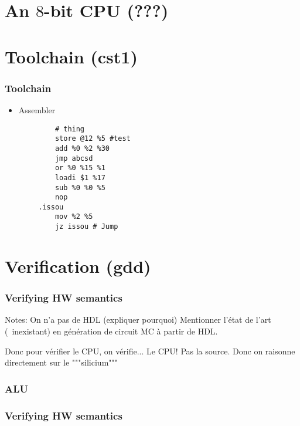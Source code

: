 \documentclass[aspectratio=169]{beamer}
\begin{document}
\section{An $8$-bit CPU (???)}
\begin{frame}
\end{frame}

\section{Toolchain (cst1)}
\begin{frame}[fragile]
	\frametitle{Toolchain}
	\begin{itemize}
		\item Assembler
	\end{itemize}
	\begin{verbatim}
            # thing
            store @12 %5 #test
            add %0 %2 %30
            jmp abcsd
            or %0 %15 %1
            loadi $1 %17
            sub %0 %0 %5
            nop
        .issou
            mov %2 %5
            jz issou # Jump
        \end{verbatim}
\end{frame}

\section{Verification (gdd)}
\begin{frame}
	\frametitle{Verifying HW semantics}
	Notes: On n'a pas de HDL (expliquer pourquoi)
	Mentionner l'état de l'art (~inexistant) en génération de circuit MC à
	partir de HDL.

	Donc pour vérifier le CPU, on vérifie... Le CPU! Pas la source.
	Donc on raisonne directement sur le """silicium"""
\end{frame}

\begin{frame}
	\frametitle{ALU}
\end{frame}

\begin{frame}
	\frametitle{Verifying HW semantics}
\end{frame}
\end{document}
